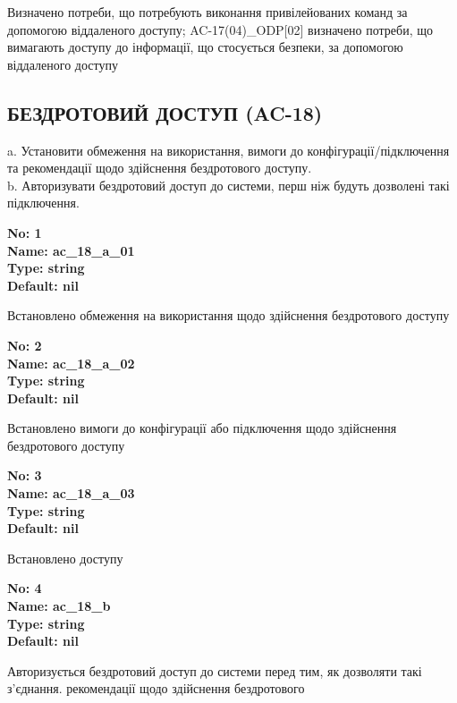 \documentclass{article}
\begin{document}
{\footnotesize Визначено потреби, що потребують виконання привілейованих команд за допомогою віддаленого доступу; AC-17(04)\_\allowbreak{}ODP[02] визначено потреби, що вимагають доступу до інформації, що стосується безпеки, за допомогою віддаленого доступу}




\subsection{БЕЗДРОТОВИЙ ДОСТУП (AC-18)}
a. Установити обмеження на використання, вимоги до конфігурації/підключення та рекомендації щодо здійснення бездротового доступу.\\ 
b. Авторизувати бездротовий доступ до системи, перш ніж будуть дозволені такі підключення.

\vspace{10pt}
{\footnotesize\bfseries
No: 1\\
Name: ac\_\allowbreak{}18\_\allowbreak{}a\_\allowbreak{}01\\
Type: string\\
Default: nil
}

{\footnotesize Встановлено обмеження на використання щодо здійснення бездротового доступу}


{\footnotesize\bfseries
No: 2\\
Name: ac\_\allowbreak{}18\_\allowbreak{}a\_\allowbreak{}02\\
Type: string\\
Default: nil
}

{\footnotesize Встановлено вимоги до конфігурації або підключення щодо здійснення бездротового доступу}


{\footnotesize\bfseries
No: 3\\
Name: ac\_\allowbreak{}18\_\allowbreak{}a\_\allowbreak{}03\\
Type: string\\
Default: nil
}

{\footnotesize Встановлено доступу}


{\footnotesize\bfseries
No: 4\\
Name: ac\_\allowbreak{}18\_\allowbreak{}b\\
Type: string\\
Default: nil
}

{\footnotesize Авторизується бездротовий доступ до системи перед тим, як дозволяти такі з'єднання. рекомендації щодо здійснення бездротового}
\end{document}

